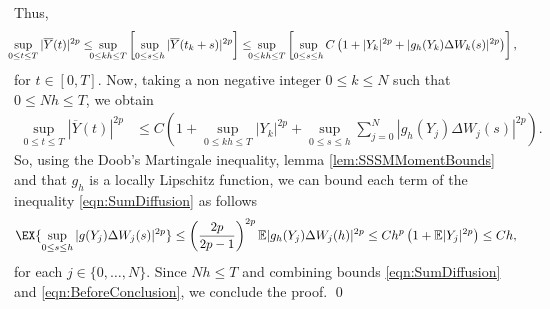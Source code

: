 	Thus, 
	\begin{equation}
		\hspace{-0.2cm}\sup_{0\leq t\leq T} |\overline{Y}(t)|^{2p}
		\leq
			\hspace{-0.2cm}\sup_{0\leq kh\leq T}
			\left[
				\sup_{0\leq s\leq h}
					|\overline{Y}(t_k+s)|^{2p} 
			\right] 
		\leq
			\hspace{-0.2cm}\sup_{0\leq kh\leq T} 
			\left[
				\sup_{0\leq s\leq h}
					C 
					\left(
						1 + |Y_k|^{2p} + |g_h(Y_k)\Delta W_k(s)|^{2p}
					\right)
			\right],
		\label{eqn:BeforeDoob}
	\end{equation}
	for $t\in [0,T]$.
	Now, taking a non negative integer $0 \leq k \leq N$ such that $0\leq Nh \leq T$, we obtain
	\begin{align}
		\sup_{0\leq t\leq T} |\overline{Y}(t)|^{2p}
		&\leq 
			C
			\left(
				1
				+
				\sup_{0\leq kh\leq T} 
					|Y_k|^{2p}
					+
					\sup_{0\leq s\leq h}
						\sum_{j=0}^N
							|g_h(Y_j)\Delta W_j(s)|^{2p}
			\right) \label{eqn:SumDiffusion}.
	\end{align}
	So, using the Doob's Martingale inequality, lemma
	\ref{lem:SSSMMomentBounds} and that $g_h$ is a locally 
	Lipschitz function, we can bound each term of the inequality \eqref{eqn:SumDiffusion}
	as follows
	\begin{align}
		\EX{
			\sup_{0 \leq s \leq h} |g(Y_j) \Delta W_j(s)|^{2p}
		}
		\leq
			\left(
				\frac{2p}{2p-1}
			\right)^{2p}
			\m|g_h(Y_j)\Delta W_j(h)|^{2p}
		\leq
			C h^p
			\left(
				1 + \m|Y_j|^{2p}
			\right)
		 \leq C h, \label{eqn:BeforeConclusion}
	\end{align}
	for each $j \in \{0,\dots, N\}$.
	Since $Nh\leq T$ and combining bounds \eqref{eqn:SumDiffusion} 
	and \eqref{eqn:BeforeConclusion}, we conclude the proof. \qed

